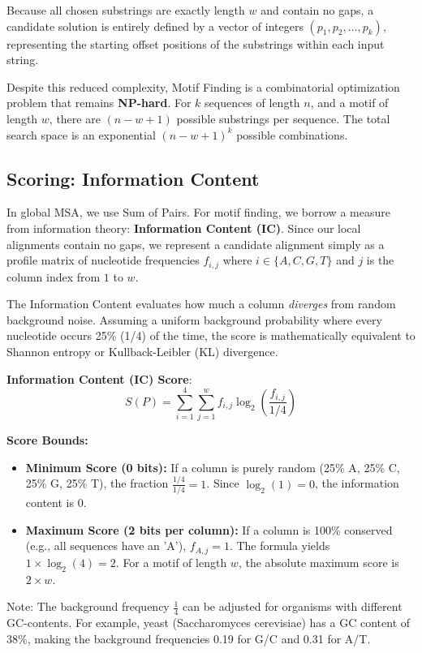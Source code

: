 Because all chosen substrings are exactly length $w$ and contain no gaps, a candidate solution is entirely defined by a vector of integers $(p_1, p_2, \dots, p_k)$, representing the starting offset positions of the substrings within each input string.

Despite this reduced complexity, Motif Finding is a combinatorial optimization problem that remains \textbf{NP-hard}. For $k$ sequences of length $n$, and a motif of length $w$, there are $(n-w+1)$ possible substrings per sequence. The total search space is an exponential $(n-w+1)^k$ possible combinations.

\subsection{Scoring: Information Content}
In global MSA, we use Sum of Pairs. For motif finding, we borrow a measure from information theory: \textbf{Information Content (IC)}. Since our local alignments contain no gaps, we represent a candidate alignment simply as a profile matrix of nucleotide frequencies $f_{i,j}$ where $i \in \{A,C,G,T\}$ and $j$ is the column index from $1$ to $w$.

The Information Content evaluates how much a column \textit{diverges} from random background noise. Assuming a uniform background probability where every nucleotide occurs 25\% (1/4) of the time, the score is mathematically equivalent to Shannon entropy or Kullback-Leibler (KL) divergence.

\begin{important}
  \textbf{Information Content (IC) Score}:
  \[
  S(P) = \sum_{i=1}^{4} \sum_{j=1}^{w} f_{i,j} \log_{2} \left( \frac{f_{i,j}}{1/4} \right)
  \]
\end{important}

\textbf{Score Bounds:}
\begin{itemize}
  \item \textbf{Minimum Score (0 bits):} If a column is purely random (25\% A, 25\% C, 25\% G, 25\% T), the fraction $\frac{1/4}{1/4} = 1$. Since $\log_2(1) = 0$, the information content is $0$.
  \item \textbf{Maximum Score (2 bits per column):} If a column is 100\% conserved (e.g., all sequences have an 'A'), $f_{A,j} = 1$. The formula yields $1 \times \log_2(4) = 2$. For a motif of length $w$, the absolute maximum score is $2 \times w$.
\end{itemize}

\sta Note: The background frequency $\frac{1}{4}$ can be adjusted for organisms with different GC-contents. For example, yeast (Saccharomyces cerevisiae) has a GC content of 38\%, making the background frequencies 0.19 for G/C and 0.31 for A/T.

